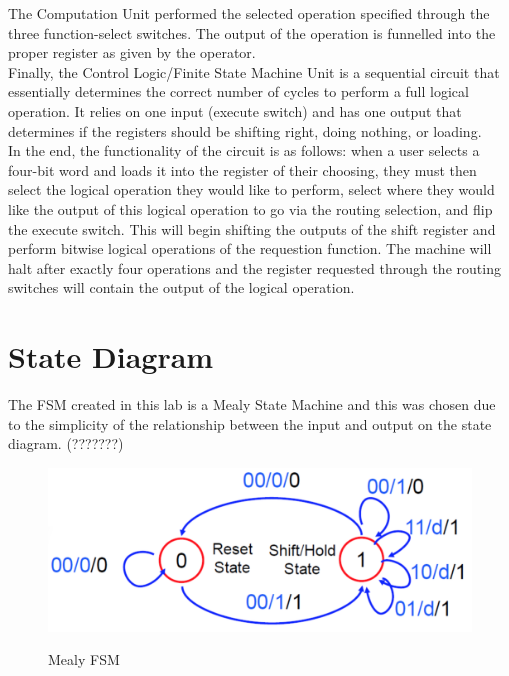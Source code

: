 \documentclass[journal, twocolumn, final,11pt,letterpaper]{IEEEtran}
\begin{document}
The Computation Unit performed the selected operation specified through the three function-select switches. The output of the operation is funnelled into the proper register as given by the operator. \\

Finally, the Control Logic/Finite State Machine Unit is a sequential circuit that essentially determines the correct  number of cycles to perform a full logical operation. It relies on one input (execute switch) and has one output that determines if the registers should be shifting right, doing nothing, or loading. \\

In the end, the functionality of the circuit is as follows: when a user selects a four-bit word and loads it into the register of their choosing, they must then select the logical operation they would like to perform, select where they would like the output of this logical operation to go via the routing selection, and flip the execute switch. This will begin shifting the outputs of the shift register and perform bitwise logical operations of the requestion function. The machine will halt after exactly four operations and the register requested through the routing switches will contain the output of the logical operation. \\

\section{State Diagram}
The FSM created in this lab is a Mealy State Machine and this was chosen due to the simplicity of the relationship between the input and output on the state diagram. (???????)

\begin{figure} [H]
	\centering
	\includegraphics[scale=0.35]{FSM.png}
	\label{fig:mealy-fsm}
	\caption{Mealy FSM}
\end{figure}    
\end{document}
